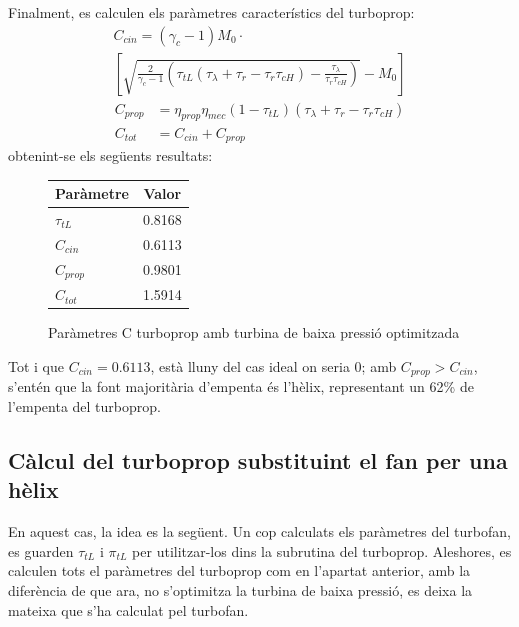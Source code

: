 Finalment, es calculen els paràmetres característics del turboprop:
\begin{multline}
	C_{cin} = (\gamma_c-1)M_0\cdot\\
	\left[\sqrt{\frac{2}{\gamma_c-1}\left(\tau_{tL}(\tau_{\lambda}+\tau_r-\tau_r\tau_{cH})-\frac{\tau_{\lambda}}{\tau_r\tau_{cH}}\right)}-M_0\right] \label{turboprop_eqn1}
\end{multline}
	\begin{align}
	C_{prop} &= \eta_{prop}\eta_{mec}(1-\tau_{tL})(\tau_\lambda+\tau_r-\tau_r\tau_{cH}) \label{turboprop_eqn2}\\
	C_{tot} &= C_{cin} + C_{prop} \label{turboprop_eqn3}
	\end{align}
obtenint-se els següents resultats:
\begin{figure}[H]
	\centering
	\begin{tabular}{lc}
		\toprule[3pt]
		\textbf{Paràmetre}&\textbf{Valor}\\
		\midrule[1pt]
		$\tau_{tL}$ & 0.8168\\
		$C_{cin}$ & 0.6113\\
		$C_{prop}$ & 0.9801\\
		$C_{tot}$ & 1.5914\\
		
		\bottomrule[2pt]
	\end{tabular}
\label{C_opti}
\caption{Paràmetres C turboprop amb turbina de baixa pressió optimitzada}
\end{figure}
\noindent Tot i que $C_{cin}=0.6113$, està lluny del cas ideal on seria 0; amb $C_{prop}>C_{cin}$, s'entén que la font majoritària d'empenta és l'hèlix, representant un 62\% de l'empenta del turboprop.

\subsection{Càlcul del turboprop substituint el fan per una hèlix}
En aquest cas, la idea es la següent. Un cop calculats els paràmetres del turbofan, es guarden $\tau_{tL}$ i $\pi_{tL}$  per utilitzar-los dins la subrutina del turboprop. Aleshores, es calculen tots el paràmetres del turboprop com en l'apartat anterior, amb la diferència de que ara, no s'optimitza la turbina de baixa pressió, es deixa la mateixa que s'ha calculat pel turbofan.

